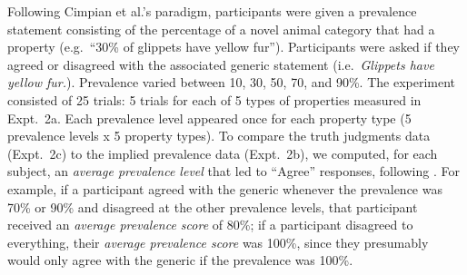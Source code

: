 \documentclass{pnastwo}
\begin{document}
\begin{article}
\begin{materials}
Following Cimpian et al.'s paradigm, participants were given a prevalence statement consisting of the percentage of a novel animal category that had a property (e.g.~``30\% of glippets have yellow fur''). 
Participants were asked if they agreed or disagreed with the associated generic statement (i.e.~\emph{Glippets have yellow fur.}).
Prevalence varied between 10, 30, 50, 70, and 90\%.
The experiment consisted of 25 trials: 5 trials for each of 5 types of properties measured in Expt.~2a. %
Each prevalence level appeared once for each property type (5 prevalence levels x 5 property types). 
To compare the truth judgments data (Expt.~2c) to the implied prevalence data (Expt.~2b), we computed, for each subject, an \emph{average prevalence level} that led to ``Agree'' responses, following \cite{Cimpian2010}.
For example, if a participant agreed with the generic whenever the prevalence was 70\% or 90\% and disagreed at the other prevalence levels, that participant received an \emph{average prevalence score} of 80\%; if a participant disagreed to everything, their \emph{average prevalence score} was 100\%, since they presumably would only agree with the generic if the prevalence was 100\%.

\end{materials}
\end{article}
\end{document}
